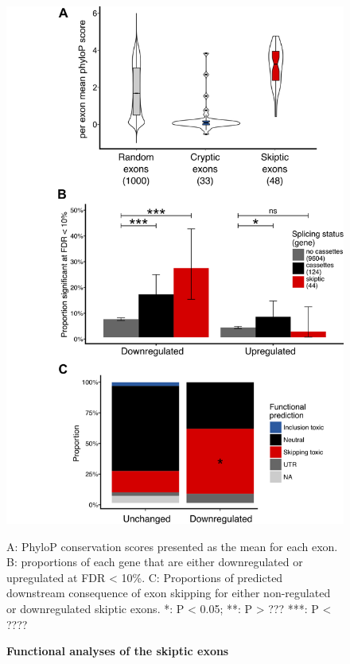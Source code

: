 \begin{figure}[h!]
	\centering
	\includegraphics[width=12cm]{Figures/05_tdp_mice/functional_plots_vertical.png}
	\caption{\textbf{Functional analyses of the skiptic exons}}
	A: PhyloP conservation scores presented as the mean for each exon. B: proportions of each gene that are either downregulated or upregulated at FDR < 10\%. C: Proportions of predicted downstream consequence of exon skipping for either non-regulated or downregulated skiptic exons. *: P < 0.05; **: P > ??? ***: P < ????
	\label{fig:functional_plots}
\end{figure}


